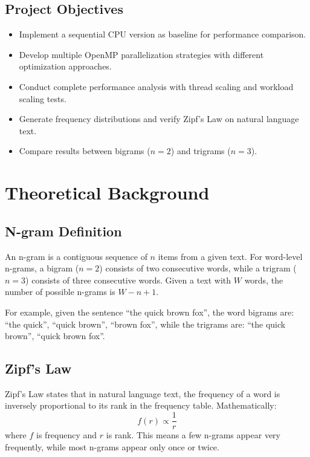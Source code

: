 \documentclass[10pt,twocolumn,letterpaper]{article}
\begin{document}
\subsection{Project Objectives}

\begin{itemize}
\item Implement a sequential CPU version as baseline for performance comparison.
\item Develop multiple OpenMP parallelization strategies with different optimization approaches.
\item Conduct complete performance analysis with thread scaling and workload scaling tests.
\item Generate frequency distributions and verify Zipf's Law on natural language text.
\item Compare results between bigrams ($n=2$) and trigrams ($n=3$).
\end{itemize}

\section{Theoretical Background}

\subsection{N-gram Definition}

An n-gram is a contiguous sequence of $n$ items from a given text. For word-level n-grams, a bigram ($n=2$) consists of two consecutive words, while a trigram ($n=3$) consists of three consecutive words. Given a text with $W$ words, the number of possible n-grams is $W - n + 1$.

For example, given the sentence ``the quick brown fox'', the word bigrams are: ``the quick'', ``quick brown'', ``brown fox'', while the trigrams are: ``the quick brown'', ``quick brown fox''.

\subsection{Zipf's Law}

Zipf's Law states that in natural language text, the frequency of a word is inversely proportional to its rank in the frequency table. Mathematically:
\begin{equation}
f(r) \propto \frac{1}{r}
\end{equation}
where $f$ is frequency and $r$ is rank. This means a few n-grams appear very frequently, while most n-grams appear only once or twice.
\end{document}

